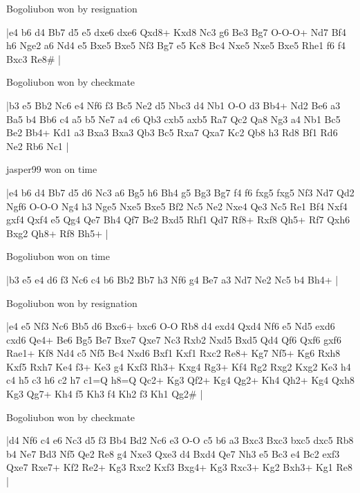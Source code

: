 \showboard

Bogoliubon won by resignation

\makegametitle
|e4 b6 d4 Bb7 d5 e5 dxe6 dxe6 Qxd8+ Kxd8 Nc3 g6 Be3 Bg7 O-O-O+ Nd7 Bf4 h6 Nge2 a6 Nd4 e5 Bxe5 Bxe5 Nf3 Bg7 e5 Kc8 Bc4 Nxe5 Nxe5 Bxe5 Rhe1 f6 f4 Bxc3 Re8\#  |

\showboard

Bogoliubon won by checkmate

\makegametitle
|b3 e5 Bb2 Nc6 e4 Nf6 f3 Bc5 Ne2 d5 Nbc3 d4 Nb1 O-O d3 Bb4+ Nd2 Be6 a3 Ba5 b4 Bb6 c4 a5 b5 Ne7 a4 c6 Qb3 cxb5 axb5 Ra7 Qc2 Qa8 Ng3 a4 Nb1 Bc5 Be2 Bb4+ Kd1 a3 Bxa3 Bxa3 Qb3 Bc5 Rxa7 Qxa7 Kc2 Qb8 h3 Rd8 Bf1 Rd6 Ne2 Rb6 Nc1  |

\showboard

jasper99 won on time

\makegametitle
|e4 b6 d4 Bb7 d5 d6 Nc3 a6 Bg5 h6 Bh4 g5 Bg3 Bg7 f4 f6 fxg5 fxg5 Nf3 Nd7 Qd2 Ngf6 O-O-O Ng4 h3 Nge5 Nxe5 Bxe5 Bf2 Nc5 Ne2 Nxe4 Qe3 Nc5 Re1 Bf4 Nxf4 gxf4 Qxf4 e5 Qg4 Qe7 Bh4 Qf7 Be2 Bxd5 Rhf1 Qd7 Rf8+ Rxf8 Qh5+ Rf7 Qxh6 Bxg2 Qh8+ Rf8 Bh5+  |

\showboard

Bogoliubon won on time

\makegametitle
|b3 e5 e4 d6 f3 Nc6 c4 b6 Bb2 Bb7 h3 Nf6 g4 Be7 a3 Nd7 Ne2 Nc5 b4 Bh4+  |

\showboard

Bogoliubon won by resignation

\makegametitle
|e4 e5 Nf3 Nc6 Bb5 d6 Bxc6+ bxc6 O-O Rb8 d4 exd4 Qxd4 Nf6 e5 Nd5 exd6 cxd6 Qe4+ Be6 Bg5 Be7 Bxe7 Qxe7 Nc3 Rxb2 Nxd5 Bxd5 Qd4 Qf6 Qxf6 gxf6 Rae1+ Kf8 Nd4 c5 Nf5 Bc4 Nxd6 Bxf1 Kxf1 Rxc2 Re8+ Kg7 Nf5+ Kg6 Rxh8 Kxf5 Rxh7 Ke4 f3+ Ke3 g4 Kxf3 Rh3+ Kxg4 Rg3+ Kf4 Rg2 Rxg2 Kxg2 Ke3 h4 c4 h5 c3 h6 c2 h7 c1=Q h8=Q Qc2+ Kg3 Qf2+ Kg4 Qg2+ Kh4 Qh2+ Kg4 Qxh8 Kg3 Qg7+ Kh4 f5 Kh3 f4 Kh2 f3 Kh1 Qg2\#  |

\showboard

Bogoliubon won by checkmate

\makegametitle
|d4 Nf6 c4 e6 Nc3 d5 f3 Bb4 Bd2 Nc6 e3 O-O c5 b6 a3 Bxc3 Bxc3 bxc5 dxc5 Rb8 b4 Ne7 Bd3 Nf5 Qe2 Re8 g4 Nxe3 Qxe3 d4 Bxd4 Qe7 Nh3 e5 Bc3 e4 Bc2 exf3 Qxe7 Rxe7+ Kf2 Re2+ Kg3 Rxc2 Kxf3 Bxg4+ Kg3 Rxc3+ Kg2 Bxh3+ Kg1 Re8  |

